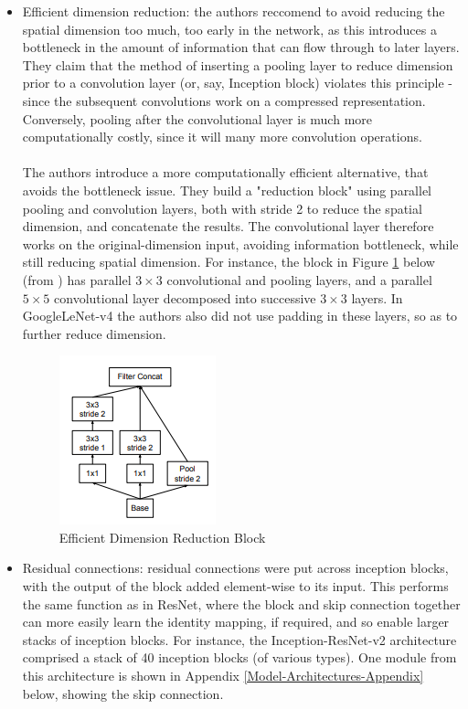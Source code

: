 \documentclass[11pt]{article} %
\theoremstyle{plain}
\theoremstyle{definition}
\begin{document}
\begin{itemize}
    \item Efficient dimension reduction: the authors reccomend to avoid reducing the spatial dimension too much, too early in the network, as this introduces a bottleneck in the amount of information that can flow through to later layers. They claim that the method of inserting a pooling layer to reduce dimension prior to a convolution layer (or, say, Inception block) violates this principle - since the subsequent convolutions work on a compressed representation. Conversely, pooling after the convolutional layer is much more computationally costly, since it will many more convolution operations. 
    \\
    \\
    \noindent
    The authors introduce a more computationally efficient alternative, that avoids the bottleneck issue. They build a "reduction block" using parallel pooling and convolution layers, both with stride 2 to reduce the spatial dimension, and concatenate the results. The convolutional layer therefore works on the original-dimension input, avoiding information bottleneck, while still reducing spatial dimension. For instance, the block in Figure \ref{fig:EfficientSpatialReductionBlock} below (from \cite{GoogLeNet_v3_Paper}) has parallel \(3 \times 3\) convolutional and pooling layers, and a parallel \(5 \times 5\) convolutional layer decomposed into successive \(3 \times 3\) layers. In GoogleLeNet-v4 the authors also did not use padding in these layers, so as to further reduce dimension.
    \begin{figure}[!ht]
        \centering    
        \caption{Efficient Dimension Reduction Block}
        \label{fig:EfficientSpatialReductionBlock}
        \includegraphics[scale=0.7]{EfficientSpatialReductionBlock.PNG}
    \end{figure}
    \item Residual connections: residual connections were put across inception blocks, with the output of the block added element-wise to its input. This performs the same function as in ResNet, where the block and skip connection together can more easily learn the identity mapping, if required, and so enable larger stacks of inception blocks. For instance, the Inception-ResNet-v2 architecture comprised a stack of 40 inception blocks (of various types). One module from this architecture is shown in Appendix \ref{Model-Architectures-Appendix}  below, showing the skip connection.
\end{itemize}
\end{document}
